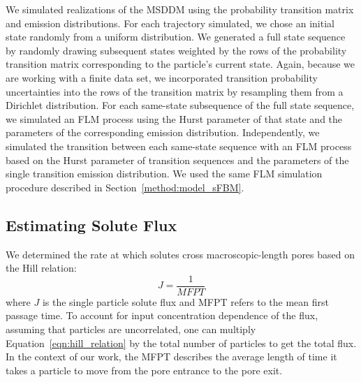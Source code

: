 \documentclass[12pt]{article}
\begin{document}
  
  We simulated realizations of the MSDDM using the probability transition matrix and 
  emission distributions. For each trajectory simulated, we chose an initial state
  randomly from a uniform distribution. We generated a full state sequence by randomly
  drawing subsequent states weighted by the rows of the probability transition matrix
  corresponding to the particle's current state. Again, because we are working with a
  finite data set, we incorporated transition probability uncertainties into the rows
  of the transition matrix by resampling them from a Dirichlet distribution. For each 
  same-state subsequence of the full state sequence, we simulated an FLM process using
  the Hurst parameter of that state and the parameters of the corresponding emission
  distribution. Independently, we simulated the transition between each same-state 
  sequence with an FLM process based on the Hurst parameter of transition sequences 
  and the parameters of the single transition emission distribution. We used the same
  FLM simulation procedure described in Section~\ref{method:model_sFBM}.


  \subsection{Estimating Solute Flux}\label{method:mfpt}
  
  We determined the rate at which solutes cross macroscopic-length pores based on the
  Hill relation:~\cite{hill_free_1989}
  \begin{equation}
  J = \frac{1}{MFPT}
  \label{eqn:hill_relation}
  \end{equation}
  where $J$ is the single particle solute flux and MFPT refers to the mean first passage
  time. To account for input concentration dependence of the flux, assuming that particles
  are uncorrelated, one can multiply Equation~\ref{eqn:hill_relation} by the total number
  of particles to get the total flux. In the context of our work, the MFPT describes the
  average length of time it takes a particle to move from the pore entrance to the pore exit. 
  
\end{document}
